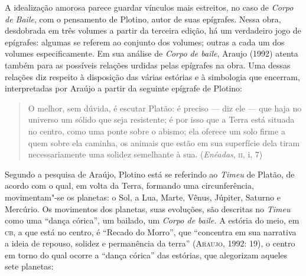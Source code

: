 {A idealização amorosa parece guardar vínculos mais estreitos, no caso
de \emph{Corpo de Baile}, com o pensamento de Plotino, autor de
suas epígrafes. Nessa obra, desdobrada em três volumes a partir da
terceira edição, há um verdadeiro jogo de epígrafes: algumas se
referem ao conjunto dos volumes; outras a cada um dos volumes
especificamente. Em sua análise de \emph{Corpo de baile}, Araujo
(1992) atenta também para as possíveis relações urdidas pelas
epígrafes na obra. Uma dessas relações diz respeito à disposição das
várias estórias e à simbologia que encerram, interpretadas por Araújo
a partir da seguinte epígrafe de Plotino:

\begin{quote}
O melhor, sem dúvida, é escutar Platão: é preciso --- diz ele --- que haja
no universo um sólido que seja resistente; é por isso que a Terra
está situada no centro, como uma ponte sobre o abismo; ela oferece um
solo firme a quem sobre ela caminha, os animais que estão em sua
superfície dela tiram necessariamente uma solidez semelhante à sua.
(\emph{Enéadas}, \textsc{ii}, i, 7)
\end{quote}

Segundo a pesquisa de Araújo, Plotino está se referindo ao
\emph{Timeu} de Platão, de acordo com o qual, em volta da Terra,
formando uma circunferência, movimentam"-se os planetas: o Sol, a Lua,
Marte, Vênus, Júpiter, Saturno e Mercúrio. Os movimentos dos
planetas, suas evoluções, são descritas no \emph{Timeu} como uma
“dança córica”, um bailado, um \emph{Corpo de baile.} A estória do
meio, em \textsc{cb}, a que está no centro, é “Recado do Morro”, que
“concentra em sua narrativa a ideia de repouso, solidez e permanência
da terra” (\textsc{Araujo}, 1992: 19), o centro em torno do qual ocorre a
“dança córica” das estórias, que alegorizam aqueles sete planetas: 

}
